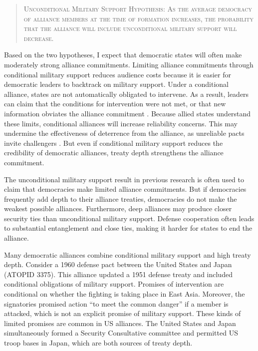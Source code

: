 \documentclass[12pt]{article}
\begin{document}
\begin{quote}
\textsc{Unconditional Military Support Hypothesis: As the average democracy of alliance members at the time of formation increases, the probability that the alliance will include unconditional military support will decrease.}
\end{quote} 


Based on the two hypotheses, I expect that democratic states will often make moderately strong alliance commitments. 
Limiting alliance commitments through conditional military support reduces audience costs because it is easier for democratic leaders to backtrack on military support. 
Under a conditional alliance, states are not automatically obligated to intervene. 
As a result, leaders can claim that the conditions for intervention were not met, or that new information obviates the alliance commitment \citep{LevenduskyHorowitz2012}. 
Because allied states understand these limits, conditional alliances will increase reliability concerns. 
This may undermine the effectiveness of deterrence from the alliance, as unreliable pacts invite challengers \citep{Smith1995}. 
But even if conditional military support reduces the credibility of democratic alliances, treaty depth strengthens the alliance commitment. 


The unconditional military support result in previous research is often used to claim that democracies make limited alliance commitments. 
But if democracies frequently add depth to their alliance treaties, democracies do not make the weakest possible alliances. 
Furthermore, deep alliances may produce closer security ties than unconditional military support. 
Defense cooperation often leads to substantial entanglement and close ties, making it harder for states to end the alliance. 


Many democratic alliances combine conditional military support and high treaty depth. 
Consider a 1960 defense pact between the United States and Japan (ATOPID 3375).
This alliance updated a 1951 defense treaty and included conditional obligations of military support. 
Promises of intervention are conditional on whether the fighting is taking place in East Asia. 
Moreover, the signatories promised action ``to meet the common danger'' if a member is attacked, which is not an explicit promise of military support. 
These kinds of limited promises are common in US alliances. 
The United States and Japan simultaneously formed a Security Consultative committee and permitted US troop bases in Japan, which are both sources of treaty depth.  
\end{document}
